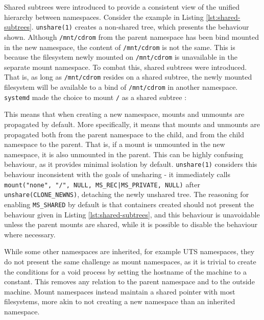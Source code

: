 \documentclass[12pt,a4paper,twoside]{report}
\begin{document}
Shared subtrees \citep{pai_shared_2005} were introduced to provide a consistent view of the unified hierarchy between namespaces. Consider the example in Listing \ref{lst:shared-subtrees}. \texttt{unshare(1)} creates a non-shared tree, which presents the behaviour shown. Although \texttt{/mnt/cdrom} from the parent namespace has been bind mounted in the new namespace, the content of \texttt{/mnt/cdrom} is not the same. This is because the filesystem newly mounted on \texttt{/mnt/cdrom} is unavailable in the separate mount namespace. To combat this, shared subtrees were introduced. That is, as long as \texttt{/mnt/cdrom} resides on a shared subtree, the newly mounted filesystem will be available to a bind of \texttt{/mnt/cdrom} in another namespace. \texttt{systemd} made the choice to mount \texttt{/} as a shared subtree \citep{free_software_foundation_mount_namespaces7_2021}:


This means that when creating a new namespace, mounts and unmounts are propagated by default. More specifically, it means that mounts and unmounts are propagated both from the parent namespace to the child, and from the child namespace to the parent. That is, if a mount is unmounted in the new namespace, it is also unmounted in the parent. This can be highly confusing behaviour, as it provides minimal isolation by default. \texttt{unshare(1)} considers this behaviour inconsistent with the goals of unsharing - it immediately calls \texttt{mount("none", "/", NULL, MS\_REC|MS\_PRIVATE, NULL)} after \texttt{unshare(CLONE\_NEWNS)}, detaching the newly unshared tree. The reasoning for enabling \texttt{MS\_SHARED} by default is that containers created should not present the behaviour given in Listing \ref{lst:shared-subtrees}, and this behaviour is unavoidable unless the parent mounts are shared, while it is possible to disable the behaviour where necessary.

While some other namespaces are inherited, for example UTS namespaces, they do not present the same challenge as mount namespaces, as it is trivial to create the conditions for a void process by setting the hostname of the machine to a constant. This removes any relation to the parent namespace and to the outside machine. Mount namespaces instead maintain a shared pointer with most filesystems, more akin to not creating a new namespace than an inherited namespace.
\end{document}

